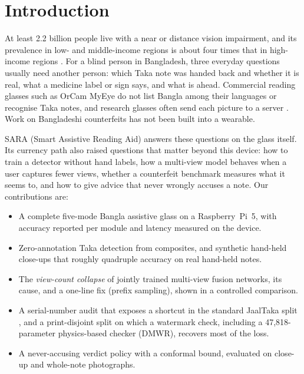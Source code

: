 \documentclass[conference]{IEEEtran}
\begin{document}
\section{Introduction}
At least 2.2 billion people live with a near or distance vision impairment, and its prevalence in low- and middle-income regions is about four times that in high-income regions \cite{who2023vision}. For a blind person in Bangladesh, three everyday questions usually need another person: which Taka note was handed back and whether it is real, what a medicine label or sign says, and what is ahead. Commercial reading glasses such as OrCam MyEye \cite{orcam} do not list Bangla among their languages or recognise Taka notes, and research glasses often send each picture to a server \cite{googleglass2021,airis2024}. Work on Bangladeshi counterfeits \cite{uddin2016counterfeit,pathak2024counterfeit,chowdhury2022uvink} has not been built into a wearable.

SARA (Smart Assistive Reading Aid) answers these questions on the glass itself. Its currency path also raised questions that matter beyond this device: how to train a detector without hand labels, how a multi-view model behaves when a user captures fewer views, whether a counterfeit benchmark measures what it seems to, and how to give advice that never wrongly accuses a note. Our contributions are:
\begin{itemize}
\item A complete five-mode Bangla assistive glass on a Raspberry~Pi~5, with accuracy reported per module and latency measured on the device.
\item Zero-annotation Taka detection from composites, and synthetic hand-held close-ups that roughly quadruple accuracy on real hand-held notes.
\item The \emph{view-count collapse} of jointly trained multi-view fusion networks, its cause, and a one-line fix (prefix sampling), shown in a controlled comparison.
\item A serial-number audit that exposes a shortcut in the standard JaalTaka split \cite{jaaltaka}, and a print-disjoint split on which a watermark check, including a 47,818-parameter physics-based checker (DMWR), recovers most of the loss.
\item A never-accusing verdict policy with a conformal bound, evaluated on close-up and whole-note photographs.
\end{itemize}
\end{document}
